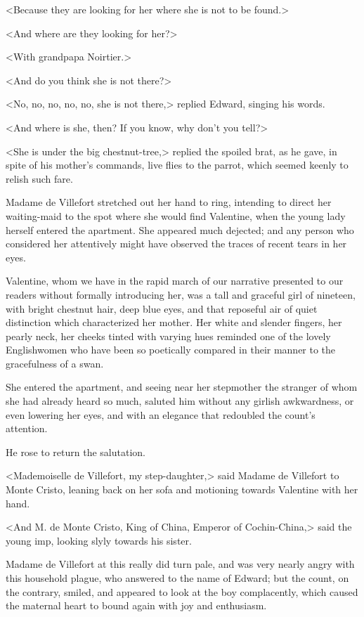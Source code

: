  <Because they are looking for her where she is not to be found.> 

 <And where are they looking for her?> 

 <With grandpapa Noirtier.> 

 <And do you think she is not there?> 

 <No, no, no, no, no, she is not there,> replied Edward, singing his words. 

 <And where is she, then? If you know, why don't you tell?> 

 <She is under the big chestnut-tree,> replied the spoiled brat, as he gave, in spite of his mother's commands, live flies to the parrot, which seemed keenly to relish such fare. 

 Madame de Villefort stretched out her hand to ring, intending to direct her waiting-maid to the spot where she would find Valentine, when the young lady herself entered the apartment. She appeared much dejected; and any person who considered her attentively might have observed the traces of recent tears in her eyes. 

 Valentine, whom we have in the rapid march of our narrative presented to our readers without formally introducing her, was a tall and graceful girl of nineteen, with bright chestnut hair, deep blue eyes, and that reposeful air of quiet distinction which characterized her mother. Her white and slender fingers, her pearly neck, her cheeks tinted with varying hues reminded one of the lovely Englishwomen who have been so poetically compared in their manner to the gracefulness of a swan. 

 She entered the apartment, and seeing near her stepmother the stranger of whom she had already heard so much, saluted him without any girlish awkwardness, or even lowering her eyes, and with an elegance that redoubled the count's attention. 

 He rose to return the salutation. 

 <Mademoiselle de Villefort, my step-daughter,> said Madame de Villefort to Monte Cristo, leaning back on her sofa and motioning towards Valentine with her hand. 

 <And M. de Monte Cristo, King of China, Emperor of Cochin-China,> said the young imp, looking slyly towards his sister. 

 Madame de Villefort at this really did turn pale, and was very nearly angry with this household plague, who answered to the name of Edward; but the count, on the contrary, smiled, and appeared to look at the boy complacently, which caused the maternal heart to bound again with joy and enthusiasm. 

